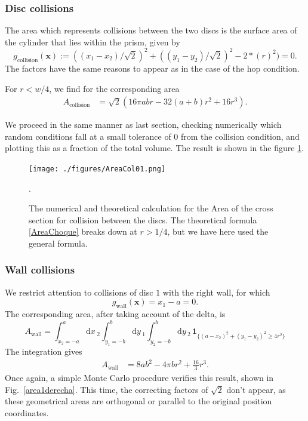 \documentclass[superscriptaddress,pre,reprint,showpacs,onecolumn]{revtex4-1}
\newcommand{\rd}[1]{\mathrm{d}{#1} \,}
\newcommand{\indicatorsymbol}{\mathbf{1}}
\newcommand{\indicator}[1]{\indicatorsymbol_{ \{   #1 \} } }
\begin{document}
\subsubsection{Disc collisions}

The area which represents collisions between the two discs is the surface area of the cylinder
that lies within the prism, given by
$$g_\text{collision}(\mathbf{x}) := ((x_1-x_2)/\sqrt{2})^2 + ((y_1-y_2)/\sqrt{2})^2
- 2*(r)^2) = 0.$$
The factors have the same reasons to appear as in the case of the hop condition.

For $r<w/4$, we find for the corresponding area
\begin{align}\label{AreaChoque}
A_\text{collision} & =  \sqrt{2} (
16\pi a b r -32 (a+b)r^2 +16 r^3).
\end{align}

We proceed in the same manner as last section, checking numerically which
random
conditions fall at a small tolerance of $0$ from the collision condition, and
plotting this as a fraction of the total volume. The result is shown in the
figure \ref{AreaChoqueTeoyNum}. 
\begin{figure}
\centering
\texttt{[image: ./figures/AreaCol01.png]}
\caption{The numerical and theoretical calculation for the Area of the cross section
for collision between the discs.  The theoretical formula 
\ref{AreaChoque} breaks down at
$r>1/4$, but we have here used the general formula.}
\label{AreaChoqueTeoyNum}.
\end{figure}


\subsubsection{Wall collisions}

We restrict attention to collisions of disc $1$ with the right wall, for which
$$g_\text{wall}(\mathbf{x}) = x_1 - a = 0.$$
The corresponding area, after taking account of the delta, is
\begin{equation}\label{areaindic}
 A_\mathrm{wall} =  \int_{x_2 = -a}^a \rd x_2 
\int_{y_1 = -b}^b \rd y_1 \int_{y_2 = -b}^b \rd y_2 \, \indicator{ (a-x_2)^2 + (y_1-y_2)^2 \ge 4 r^2 }
\end{equation}
The integration gives
\begin{align}\label{areax1p}
 A_\mathrm{wall} & = 8 a b^2-4  \pi b r^2 +\frac{16}{3}r^3 .
\end{align}
Once again, a simple Monte Carlo procedure verifies this result,
shown in Fig.~\ref{area1derecha}.
This time, the correcting factors of $\sqrt{2}$ don't appear, as
these geometrical areas are orthogonal or parallel to the original
position coordinates.
\end{document}
